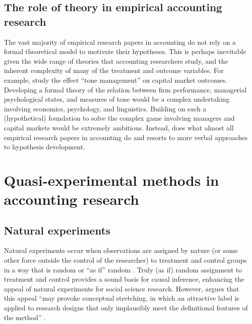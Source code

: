 \documentclass[11pt]{amsart}
\begin{document}
\subsection{The role of theory in empirical accounting research}
The vast majority of empirical research papers in accounting do not rely on a formal theoretical model to motivate their hypotheses.
This is perhaps inevitable given the wide range of theories that accounting researchers study, and the inherent complexity of many of the treatment and outcome variables.
For example, \citet{Huang:2014cs} study the effect ``tone management'' on capital market outcomes.
Developing a formal theory of the relation between firm performance, managerial psychological states, and measures of tone would be a complex undertaking involving economics, psychology, and linguistics.
Building on such a (hypothetical) foundation to solve the complex game involving managers and capital markets would be extremely ambitious.
Instead, \citet{Huang:2014cs} does what almost all empirical research papers in accounting do and resorts to more verbal approaches to hypothesis development. 


\section{Quasi-experimental methods in accounting research}


\subsection{Natural experiments}
Natural experiments occur when observations are assigned by nature (or some other force outside the control of the researcher) to treatment and control groups in a way that is random or ``as if'' random \citep{Dunning:2012tt}. 
Truly (as if) random assignment to treatment and control provides a sound basis for causal inference, enhancing the appeal of natural experiments for social science research.
However, argues that this appeal ``may provoke conceptual stretching, in which an attractive label is applied to research designs that only implausibly meet the definitional features of the method'' \citep[p.3]{Dunning:2012tt}.
\end{document}
